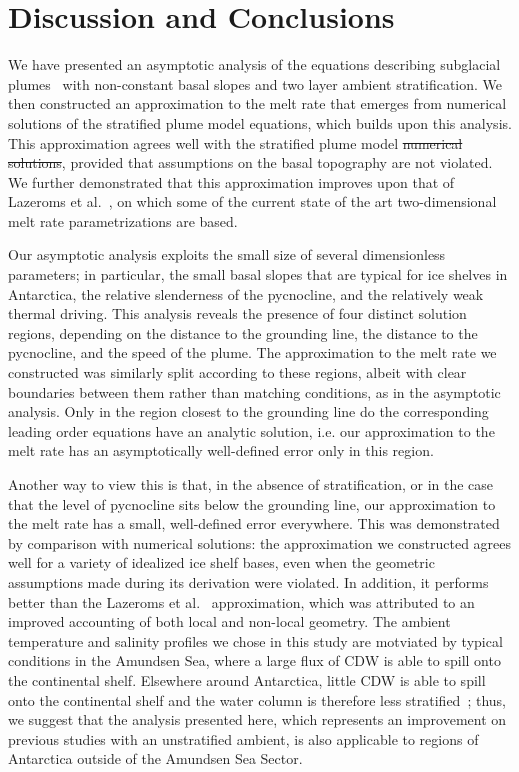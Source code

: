 \documentclass[openacc]{rsproca_new}%
\newcommand{\red}[1]{{\color{red} #1}}
\newcommand{\blue}[1]{{\color{blue} #1}}
\newcommand{\rout}[1]{\red{\st{#1}}}\newcommand{\ab}[1]{\textcolor{Green}{#1}}\newcommand{\about}[1]{\textcolor{Cyan}{\sout{#1}}}
\begin{document}
\section{Discussion and Conclusions}\label{S:Discussion}
We have presented an asymptotic analysis of the equations describing subglacial plumes~\cite{Jenkins1991JGeophysResOceans, Jenkins2011JPhysOcean} with non-constant basal slopes and two layer ambient stratification. We then constructed an approximation to the melt rate that emerges from numerical solutions of the stratified plume model equations, which builds upon this analysis. This approximation agrees well with \blue{the stratified plume model}\rout{numerical solutions}, provided that assumptions on the basal topography are not violated. We further demonstrated that this approximation improves upon that of Lazeroms et al.~\cite{Lazeroms2019JPhysOcean}, on which some of the current state of the art two-dimensional melt rate parametrizations are based.

Our asymptotic analysis exploits the small size of several dimensionless parameters; in particular, the small basal slopes that are typical for ice shelves in Antarctica, the relative slenderness of the pycnocline, and the relatively weak thermal driving. This analysis reveals the presence of four distinct solution regions, depending on the distance to the grounding line, the distance to the pycnocline, and the speed of the plume. The approximation to the melt rate we constructed was similarly split according to these regions, albeit with clear boundaries between them rather than matching conditions, as in the asymptotic analysis. Only in the region closest to the grounding line do the corresponding leading order equations have an analytic solution, i.e. our approximation to the melt rate has an asymptotically well-defined error only in this region. 

Another way to view this is that, in the absence of stratification, or in the case that the level of pycnocline sits below the grounding line, our approximation to the melt rate has a small, well-defined error everywhere. This was demonstrated by comparison with numerical solutions: the approximation we constructed agrees well for a variety of idealized ice shelf bases, even when the geometric assumptions made during its derivation were violated. In addition, it performs better than the Lazeroms et al.~\cite{Lazeroms2019JPhysOcean} approximation, which was attributed to an improved accounting of both local and non-local geometry. \blue{The ambient temperature and salinity profiles we chose in this study are motviated by typical conditions in the Amundsen Sea, where a large flux of CDW is able to spill onto the continental shelf. Elsewhere around Antarctica, little CDW is able to spill onto the continental shelf and the water column is therefore less stratified~\cite{Petty2013JPO}; thus, we suggest that the analysis presented here, which represents an improvement on previous studies with an unstratified ambient, is also applicable to regions of Antarctica outside of the Amundsen Sea Sector.}
\end{document}
